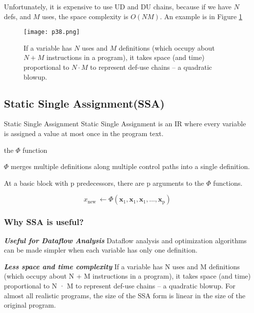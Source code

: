 Unfortunately, it is expensive to use UD and DU chains, because if we have $N$ defs, and $M$ uses,
 the space complexity is $O(NM)$. An example is in Figure \ref{fig:p38}


\begin{figure}[htb]
	\centering
	\texttt{[image: p38.png]}
	\caption{If a variable has $N$ uses and $M$ definitions (which occupy about $N + M$ instructions in a program), it takes space (and time) proportional to $N · M$ to represent def-use chains – a quadratic blowup.}
	\label{fig:p38}
\end{figure}


\subsection{Static Single Assignment(SSA)}

\begin{definition}{Static Single Assignment }
	Static Single Assignment is an IR where every variable is assigned a value at most once in the program text.
\end{definition}








\begin{definition}{the $\Phi$ function}

	$\Phi$ merges multiple definitions along multiple control paths into a single definition.

	At a basic block with p predecessors, there are p arguments to the $\Phi$ functions.

	$$ x_{\text {new }} \leftarrow \Phi\left(\mathbf{x}_1, \mathbf{x}_1, \mathbf{x}_1, \ldots, \mathbf{x}_{\mathrm{p}}\right)
	$$
\end{definition}

\subsubsection{Why SSA is useful?}

\textbf{ \large \textit{Useful for Dataflow Analysis}} Dataflow analysis and optimization algorithms can be made simpler when each variable has only one definition.

\textbf{ \large \textit{Less space and time complexity}} If a variable has N uses and M definitions (which occupy about N + M instructions in a program), it takes space (and time) proportional to N · M to represent def-use chains – a quadratic blowup. For almost all realistic programs, the size of the SSA form is linear in the size of the original program.


